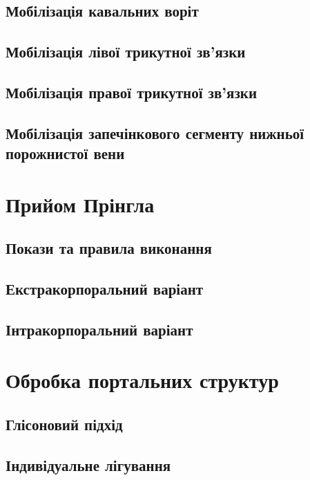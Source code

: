 \begin{refsection}
\subsection{Мобілізація кавальних воріт}

\subsection{Мобілізація лівої трикутної зв'язки}

\subsection{Мобілізація правої трикутної зв'язки}

\subsection{Мобілізація запечінкового сегменту нижньої порожнистої вени}

\section{Прийом Прінгла}

\subsection{Покази та правила виконання}

\subsection{Екстракорпоральний варіант}

\subsection{Інтракорпоральний варіант}

\section{Обробка портальних структур}

\subsection{Глісоновий підхід}

\subsection{Індивідуальне лігування}


\end{refsection}
